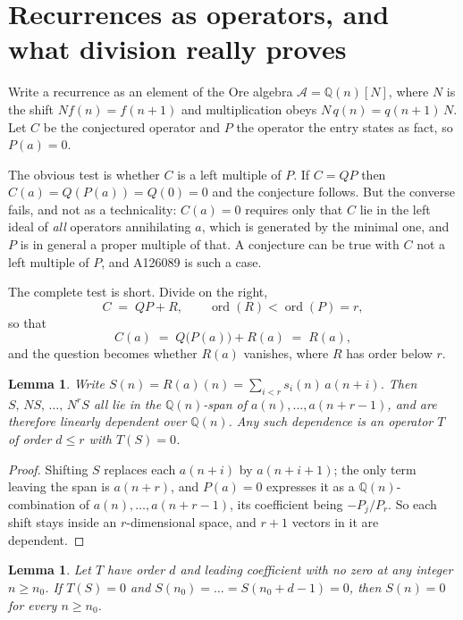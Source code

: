 \documentclass[11pt,a4paper]{article}
\theoremstyle{plain}
\newtheorem{lemma}[theorem]{Lemma}
\theoremstyle{definition}
\begin{document}
\section{Recurrences as operators, and what division really proves}

Write a recurrence as an element of the Ore algebra $\mathcal{A}=\mathbb{Q}(n)[N]$, where
$N$ is the shift $Nf(n)=f(n+1)$ and multiplication obeys $N\,q(n)=q(n+1)\,N$. Let $C$ be
the conjectured operator and $P$ the operator the entry states as fact, so $P(a)=0$.

The obvious test is whether $C$ is a left multiple of $P$. If $C=QP$ then
$C(a)=Q(P(a))=Q(0)=0$ and the conjecture follows. But the converse fails, and not as a
technicality: $C(a)=0$ requires only that $C$ lie in the left ideal of \emph{all} operators
annihilating $a$, which is generated by the minimal one, and $P$ is in general a proper
multiple of that. A conjecture can be true with $C$ not a left multiple of $P$, and
A126089 is such a case.

The complete test is short. Divide on the right,
\[
C \;=\; QP + R, \qquad \operatorname{ord}(R) < \operatorname{ord}(P) = r ,
\]
so that
\[
C(a) \;=\; Q\bigl(P(a)\bigr) + R(a) \;=\; R(a),
\]
and the question becomes whether $R(a)$ vanishes, where $R$ has order below $r$.

\begin{lemma}\label{lem:module}
Write $S(n)=R(a)(n)=\sum_{i<r}s_{i}(n)\,a(n+i)$. Then $S,\,NS,\,\dots,\,N^{r}S$ all lie in
the $\mathbb{Q}(n)$-span of $a(n),\dots,a(n+r-1)$, and are therefore linearly dependent
over $\mathbb{Q}(n)$. Any such dependence is an operator $T$ of order $d\le r$ with
$T(S)=0$.
\end{lemma}

\begin{proof}
Shifting $S$ replaces each $a(n+i)$ by $a(n+i+1)$; the only term leaving the span is
$a(n+r)$, and $P(a)=0$ expresses it as a $\mathbb{Q}(n)$-combination of
$a(n),\dots,a(n+r-1)$, its coefficient being $-P_{j}/P_{r}$. So each shift stays inside an
$r$-dimensional space, and $r+1$ vectors in it are dependent.
\end{proof}

\begin{lemma}\label{lem:prop}
Let $T$ have order $d$ and leading coefficient with no zero at any integer $n\ge n_{0}$. If
$T(S)=0$ and $S(n_{0})=\dots=S(n_{0}+d-1)=0$, then $S(n)=0$ for every $n\ge n_{0}$.
\end{lemma}
\end{document}
